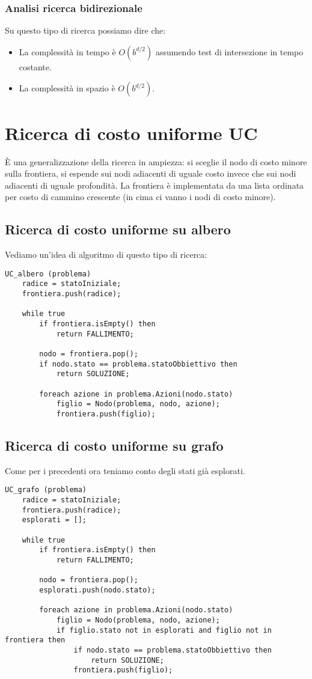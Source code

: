 \subsubsection{Analisi ricerca bidirezionale}
Su questo tipo di ricerca possiamo dire che:
\begin{itemize}
	\item La complessit\`a in tempo \`e $O(b^{d/2})$ assumendo test di intersezione in
	      tempo costante.
	\item La complessit\`a in spazio \`e $O(b^{d/2})$.
\end{itemize}

\section{Ricerca di costo uniforme UC}
\`E una generalizzazione della ricerca in ampiezza: si sceglie il nodo di costo minore sulla
frontiera, si espende sui nodi adiacenti di uguale costo invece che sui nodi adiacenti di
uguale profondit\`a.
La frontiera \`e implementata da una lista ordinata per costo di cammino crescente (in cima
ci vanno i nodi di costo minore).
\subsection{Ricerca di costo uniforme su albero}
Vediamo un'idea di algoritmo di questo tipo di ricerca:
\begin{lstlisting}[style=pseudo-style]
UC_albero (problema)
	radice = statoIniziale;
	frontiera.push(radice);

	while true
		if frontiera.isEmpty() then
			return FALLIMENTO;
		
		nodo = frontiera.pop();
		if nodo.stato == problema.statoObbiettivo then
			return SOLUZIONE;
		
		foreach azione in problema.Azioni(nodo.stato)
			figlio = Nodo(problema, nodo, azione);
			frontiera.push(figlio);
\end{lstlisting}

\subsection{Ricerca di costo uniforme su grafo}
Come per i precedenti ora teniamo conto degli stati gi\`a esplorati.
\begin{lstlisting}[style=pseudo-style]
UC_grafo (problema)
	radice = statoIniziale;
	frontiera.push(radice);
	esplorati = [];

	while true
		if frontiera.isEmpty() then
			return FALLIMENTO;
		
		nodo = frontiera.pop();
		esplorati.push(nodo.stato);
		
		foreach azione in problema.Azioni(nodo.stato)
			figlio = Nodo(problema, nodo, azione);
			if figlio.stato not in esplorati and figlio not in frontiera then
				if nodo.stato == problema.statoObbiettivo then
					return SOLUZIONE;
				frontiera.push(figlio);
\end{lstlisting}

